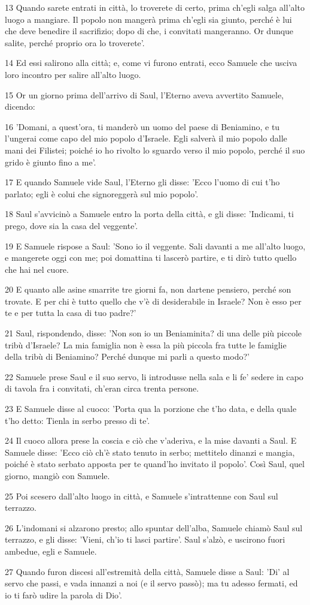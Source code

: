 \par 13 Quando sarete entrati in città, lo troverete di certo, prima ch'egli salga all'alto luogo a mangiare. Il popolo non mangerà prima ch'egli sia giunto, perché è lui che deve benedire il sacrifizio; dopo di che, i convitati mangeranno. Or dunque salite, perché proprio ora lo troverete'.
\par 14 Ed essi salirono alla città; e, come vi furono entrati, ecco Samuele che usciva loro incontro per salire all'alto luogo.
\par 15 Or un giorno prima dell'arrivo di Saul, l'Eterno aveva avvertito Samuele, dicendo:
\par 16 'Domani, a quest'ora, ti manderò un uomo del paese di Beniamino, e tu l'ungerai come capo del mio popolo d'Israele. Egli salverà il mio popolo dalle mani dei Filistei; poiché io ho rivolto lo sguardo verso il mio popolo, perché il suo grido è giunto fino a me'.
\par 17 E quando Samuele vide Saul, l'Eterno gli disse: 'Ecco l'uomo di cui t'ho parlato; egli è colui che signoreggerà sul mio popolo'.
\par 18 Saul s'avvicinò a Samuele entro la porta della città, e gli disse: 'Indicami, ti prego, dove sia la casa del veggente'.
\par 19 E Samuele rispose a Saul: 'Sono io il veggente. Sali davanti a me all'alto luogo, e mangerete oggi con me; poi domattina ti lascerò partire, e ti dirò tutto quello che hai nel cuore.
\par 20 E quanto alle asine smarrite tre giorni fa, non dartene pensiero, perché son trovate. E per chi è tutto quello che v'è di desiderabile in Israele? Non è esso per te e per tutta la casa di tuo padre?'
\par 21 Saul, rispondendo, disse: 'Non son io un Beniaminita? di una delle più piccole tribù d'Israele? La mia famiglia non è essa la più piccola fra tutte le famiglie della tribù di Beniamino? Perché dunque mi parli a questo modo?'
\par 22 Samuele prese Saul e il suo servo, li introdusse nella sala e li fe' sedere in capo di tavola fra i convitati, ch'eran circa trenta persone.
\par 23 E Samuele disse al cuoco: 'Porta qua la porzione che t'ho data, e della quale t'ho detto: Tienla in serbo presso di te'.
\par 24 Il cuoco allora prese la coscia e ciò che v'aderiva, e la mise davanti a Saul. E Samuele disse: 'Ecco ciò ch'è stato tenuto in serbo; mettitelo dinanzi e mangia, poiché è stato serbato apposta per te quand'ho invitato il popolo'. Così Saul, quel giorno, mangiò con Samuele.
\par 25 Poi scesero dall'alto luogo in città, e Samuele s'intrattenne con Saul sul terrazzo.
\par 26 L'indomani si alzarono presto; allo spuntar dell'alba, Samuele chiamò Saul sul terrazzo, e gli disse: 'Vieni, ch'io ti lasci partire'. Saul s'alzò, e uscirono fuori ambedue, egli e Samuele.
\par 27 Quando furon discesi all'estremità della città, Samuele disse a Saul: 'Di' al servo che passi, e vada innanzi a noi (e il servo passò); ma tu adesso fermati, ed io ti farò udire la parola di Dio'.

